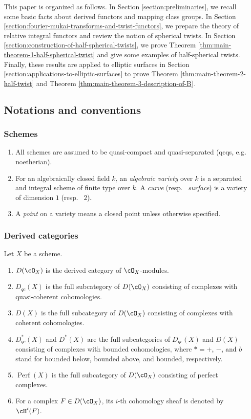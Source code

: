 \documentclass{amsart}
\numberwithin{equation}{section}
\theoremstyle{plain}
\theoremstyle{definition}
\DeclareMathOperator{\Perf}{\mathrm{Perf}}
\begin{document}
This paper is organized as follows.
In Section \ref{section:preliminaries}, we recall some basic facts about derived functors and mapping class groups.
In Section \ref{section:fourier-mukai-transforms-and-twist-functors}, we prepare the theory of relative integral functors and review the notion of spherical twists.
In Section \ref{section:construction-of-half-spherical-twists}, we prove Theorem \ref{thm:main-theorem-1-half-spherical-twist} and give some examples of half-spherical twists.
Finally, these results are applied to elliptic surfaces in Section \ref{section:applications-to-elliptic-surfaces} to prove Theorem \ref{thm:main-theorem-2-half-twist} and Theorem \ref{thm:main-theorem-3-description-of-B}.




\subsection*{Notations and conventions}
\subsubsection*{Schemes}
\begin{enumerate}
    \item All schemes are assumed to be quasi-compact and quasi-separated (qcqs, e.g.~ noetherian).
    \item For an algebraically closed field $k$, an \emph{algebraic variety} over $k$ is a separated and integral scheme of finite type over $k$. A \emph{curve} (resp.~ \emph{surface}) is a variety of dimension $1$ (resp.~ $2$).
    \item A \emph{point} on a variety means a closed point unless otherwise specified.
\end{enumerate}


\subsubsection*{Derived categories}
Let $X$ be a scheme.
\begin{enumerate}
    \item $D(\cO_X)$ is the derived category of $\cO_X$-modules.
    \item $D_{qc}(X)$ is the full subcategory of $D(\cO_X)$ consisting of complexes with quasi-coherent cohomologies.
    \item $D(X)$ is the full subcategory of $D(\cO_X)$ consisting of complexes with coherent cohomologies.
    \item $D_{qc}^*(X)$ and $D^*(X)$ are the full subcategories of $D_{qc}(X)$ and $D(X)$ consisting of complexes with bounded cohomologies, where $* = +$, $-$, and $b$ stand for bounded below, bounded above, and bounded, respectively.
    \item $\Perf(X)$ is the full subcategory of $D(\cO_X)$ consisting of perfect complexes.
    \item For a complex $F \in D(\cO_X)$, its $i$-th cohomology sheaf is denoted by $\cH^i(F)$.
\end{enumerate}
\end{document}
